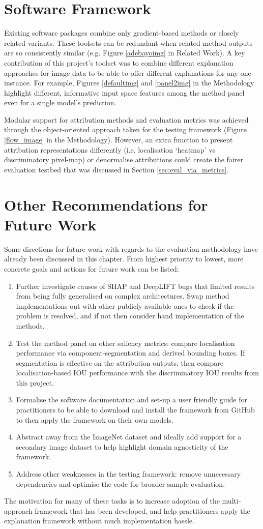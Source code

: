 \documentclass[main]{subfiles}
\begin{document}
\section{Software Framework}

Existing software packages combine only gradient-based methods or closely related variants. These toolsets can be redundant when related method outputs are so consistently similar (e.g. Figure \ref{adebayoimg} in Related Work). A key contribution of this project's toolset was to combine different explanation approaches for image data to be able to offer different explanations for any one instance. For example, Figures \ref{defaultimg} and \ref{panel2img} in the Methodology highlight different, informative input space features among the method panel even for a single model's prediction.

Modular support for attribution methods and evaluation metrics was achieved through the object-oriented approach taken for the testing framework (Figure \ref{flow_image} in the Methodology). However, an extra function to present attribution representations differently (i.e. localisation `heatmap' vs discriminatory pixel-map) or denormalise attributions could create the fairer evaluation testbed that was discussed in Section \ref{sec:eval_via_metrics}.


\section{Other Recommendations for Future Work}

Some directions for future work with regards to the evaluation methodology have already been discussed in this chapter. From highest priority to lowest, more concrete goals and actions for future work can be listed:
\begin{enumerate}
\item Further investigate causes of SHAP and DeepLIFT bugs that limited results from being fully generalised on complex architectures. Swap method implementations out with other publicly available ones to check if the problem is resolved, and if not then consider hand implementation of the methods.
\item Test the method panel on other saliency metrics: compare localisation performance via component-segmentation and derived bounding boxes. If segmentation is effective on the attribution outputs, then compare localisation-based IOU performance with the discriminatory IOU results from this project.
\item Formalise the software documentation and set-up a user friendly guide for practitioners to be able to download and install the framework from GitHub to then apply the framework on their own models.
\item Abstract away from the ImageNet dataset and ideally add support for a secondary image dataset to help highlight domain agnosticity of the framework.
\item Address other weaknesses in the testing framework: remove unnecessary dependencies and optimise the code for broader sample evaluation.
\end{enumerate}

\noindent The motivation for many of these tasks is to increase adoption of the multi-approach framework that has been developed, and help practitioners apply the explanation framework without much implementation hassle.
\end{document}
